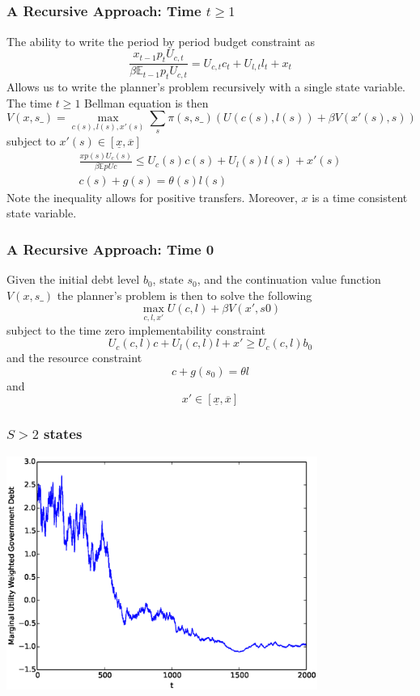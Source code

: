 \documentclass{beamer}
\newcommand{\EE}{\mathbb E}
\begin{document}
\subsection{}

 \begin{frame}
	\frametitle{A Recursive Approach: Time $t\geq 1$ }
	The ability to write the period by period budget constraint as 
	\[
		\frac{x_{t-1} p_t U_{c,t}}{\beta \EE_{t-1} p_t U_{c,t}}  = U_{c,t}c_t+U_{l,t} l_t + x_t
	\]Allows us to write the planner's problem recursively with a single state variable.  The time $t\geq 1$  Bellman equation is then
	\[
		V(x,s\_) = \max_{c(s),l(s),x'(s)} \sum_s \pi(s,s\_)\left(U(c(s),l(s)) + \beta V(x'(s),s)\right)
	\]subject to $x'(s)\in [\underline x,\overline x]$
	\begin{align*}
		\frac{x p(s) U_c(s)}{\beta\EE pUc} \leq U_c(s)c(s)+U_l(s)l(s) + x'(s)\\
		c(s) + g(s) = \theta(s)l(s)
	\end{align*}  Note the inequality allows for positive transfers.  Moreover, $x$ is a time consistent state variable.
 \end{frame}

\begin{frame}
	\frametitle{A Recursive Approach: Time 0}
	Given the initial debt level $b_0$, state $s_0$,  and the continuation value function $V(x,s\_)$ the planner's problem is then to solve the following
	\[
		\max_{c,l,x'} U(c,l) +\beta V(x',s0)
	\]subject to the time zero implementability constraint
	\[
		U_{c}(c,l)c + U_l(c,l) l + x' \geq U_c(c,l) b_0
	\]and the resource constraint
	\[
		c+ g(s_0) = \theta l
	\]and
	\[
		x' \in [\underline x,\overline x]
	\]
\end{frame}

\begin{frame}
	\frametitle{$S>2$ states}
	\begin{center}
	\includegraphics[width=4in]{Images/5stateiid.eps}
	\end{center}
\end{frame}
\end{document}
